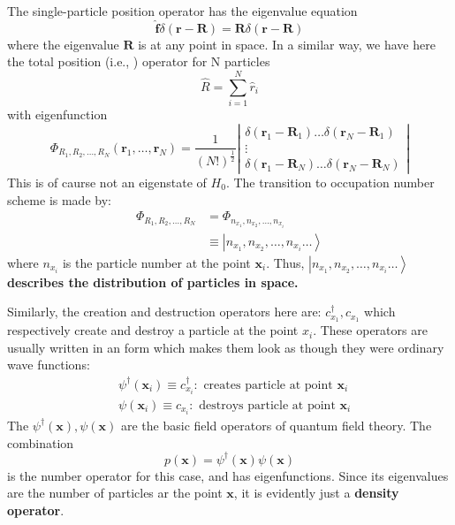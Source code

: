 The single-particle position operator has the eigenvalue equation
\begin{equation}\hat{\mathbf{f}} \delta(\mathbf{r}-\mathbf{R})=\mathbf{R} \delta(\mathbf{r}-\mathbf{R})\end{equation}
where the eigenvalue $\mathbf{R}$ is at any point in space. In a similar way, we have here the total position (i.e., ) operator for N particles
\begin{equation}\hat{R}=\sum_{i=1}^{N} \hat{r}_{i}\end{equation}
with eigenfunction
\begin{equation}\Phi_{R_{1}, R_{2}, \ldots, R_{N}}\left(\mathbf{r}_{1}, \ldots, \mathbf{r}_{N}\right)=\frac{1}{(N !)^{\frac{1}{2}}}\left|\begin{array}{c}
\delta\left(\mathbf{r}_{1}-\mathbf{R}_{1}\right) \ldots \delta\left(\mathbf{r}_{N}-\mathbf{R}_{1}\right) \\
\vdots \\
\delta\left(\mathbf{r}_{1}-\mathbf{R}_{N}\right) \ldots \delta\left(\mathbf{r}_{N}-\mathbf{R}_{N}\right)
\end{array}\right|\end{equation}
This is of caurse not an eigenstate of $H_0$. The transition to occupation number scheme is made by:
\begin{equation}\begin{aligned}
\Phi_{R_{1}, R_{2}, \ldots, R_{N}} &=\Phi_{n_{x_1}, n_{x_{2}}, \ldots, n_{x_{i}}} \\
& \equiv\left|n_{x_{1}}, n_{x_{2}}, \ldots, n_{x_{i}} \ldots\right\rangle
\end{aligned}\end{equation}
where $n_{x_i}$ is the particle number at the point $\mathbf{x}_i$. Thus, $\left|n_{x_{1}}, n_{x_{2}}, \ldots, n_{x_{i}} \ldots\right\rangle$ \textbf{describes the distribution of particles in space.}

Similarly, the creation and destruction operators here are: $c_{x_{1}}^{\dagger}, c_{x_{1}}$ which respectively create and destroy a particle at the point $x_{i}$. These operators are usually written in an form which makes them look as though they were ordinary wave functions:
\begin{equation}\begin{aligned}
&\psi^{\dagger}\left(\mathbf{x}_{i}\right) \equiv c_{x_{i}}^{\dagger}: \text { creates particle at point } \mathbf{x}_{i}\\
&\psi\left(\mathbf{x}_{i}\right) \equiv c_{x_{i}}: \text { destroys particle at point } \mathbf{x}_{i}
\end{aligned}\end{equation}
The $\psi^{\dagger}(\mathbf{x}), \psi(\mathbf{x})$ are the basic field operators of quantum field theory. The combination
\begin{equation}p(\mathbf{x})=\psi^{\dagger}(\mathbf{x}) \psi(\mathbf{x})\end{equation}
is the number operator for this case, and has eigenfunctions. Since its eigenvalues are the number of particles ar the point $\mathbf{x}$, it is evidently just a \textbf{density operator}.

